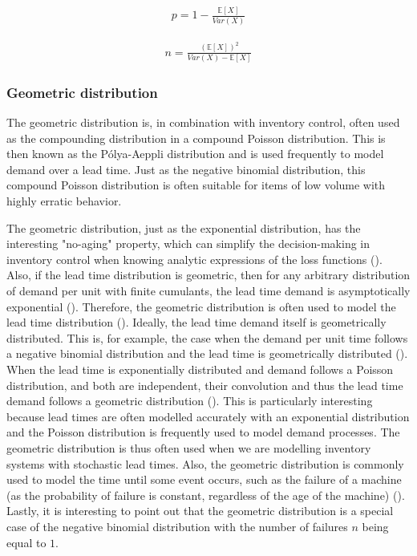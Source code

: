 \documentclass{article}
\begin{document}
\begin{align*}
    p = 1-\frac{\mathbb{E}[X]}{Var(X)}
\end{align*}

\begin{align*}
    n = \frac{(\mathbb{E}[X])^2}{Var(X)-\mathbb{E}[X]}
\end{align*}


\subsubsection{Geometric distribution}
\begin{flushleft}
    The geometric distribution is, in combination with inventory control, often used  as the compounding distribution in a compound Poisson distribution. This is then known as the Pólya-Aeppli distribution and is used frequently to model demand over a lead time.
    Just as the negative binomial distribution, this compound Poisson distribution is often suitable for items of low volume with highly erratic behavior.
\end{flushleft}
\begin{flushleft}
    The geometric distribution, just as the exponential distribution, has the interesting "no-aging" property, which can simplify the decision-making in inventory control when knowing analytic expressions of the loss functions (\cite{https://doi.org/10.1002/nav.3800230104}).
    Also, if the lead time distribution is geometric, then for any arbitrary distribution of demand per unit with finite cumulants, the lead time demand is asymptotically exponential (\cite{articleCarlson}).
    Therefore, the geometric distribution is often used to model the lead time distribution (\cite{articleCarlson2}).
    Ideally, the lead time demand itself is geometrically distributed. This is, for example, the case when the demand per unit time follows a negative binomial distribution and the lead time is geometrically distributed (\cite{Magistad}).
    When the lead time is exponentially distributed and demand follows a Poisson distribution, and both are independent, their convolution and thus the lead time demand follows a geometric distribution (\cite{articleCarlson2}).
    This is particularly interesting because lead times are often modelled accurately with an exponential distribution and the Poisson distribution is frequently used to model demand processes.
    The geometric distribution is thus often used when we are modelling inventory systems with stochastic lead times.
    Also, the geometric distribution is commonly used to model the time until some event occurs, such as the failure of a machine (as the probability of failure is constant, regardless of the age of the machine) (\cite{zipkin2000foundations}).
    Lastly, it is interesting to point out that the geometric distribution is a special case of the negative binomial distribution with the number of failures $n$ being equal to $1$.
\end{flushleft}
\end{document}
